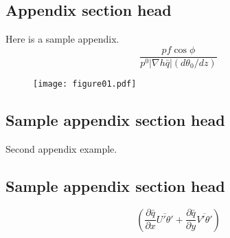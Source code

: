 \documentclass[twocol]{ametsocV5}
\begin{document}
\appendix
{}

\subsection*{Appendix section head}

Here is a sample appendix.
\begin{equation}
\frac{
pf \cos\phi}
{p^0|\nabla h\bar q|(d\theta_0/dz)}
\end{equation}


\begin{figure}
 \centerline{\texttt{[image: figure01.pdf]}}
\end{figure}


\appendix[B]
\subsection{Sample appendix section head}
Second appendix example.
\subsection{Sample appendix section head}
\begin{equation}
\left(\frac{\partial\bar q}{\partial x}
\overline{U'\theta'} +
\frac{\partial\bar q}{\partial y}
\overline{V'\theta'}\right) 
\end{equation}











\end{document}

